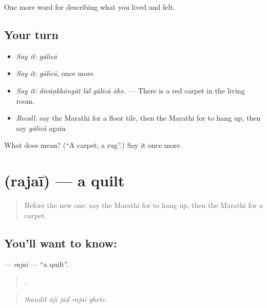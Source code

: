 \begin{grammarlens}[title={What you've built}]
One more word for describing what you lived and felt.
\end{grammarlens}

\subsection*{Your turn}
\begin{itemize}
\raggedright
  \item \emph{Say it:} \emph{gālicā}
  \item \emph{Say it:} \emph{gālicā}, once more
  \item \emph{Say it:} \emph{divāṇkhānyāt lāl gālicā āhe.} — There is a red carpet in the living room.
  \item \emph{Recall:} say the Marathi for a floor tile, then the Marathi for to hang up, then say \emph{gālicā} again
\end{itemize}

\begin{tcolorbox}[breakable,colback=teal!4,colframe=teal!35!black,title={Before you move on}]
What does  mean? (\textquotedblleft{}A carpet; a rug\textquotedblright{}.) Say it once more.
\end{tcolorbox}
\section[\texorpdfstring{\mr{रजई} (rajaī)}{रजई (rajaī)}]{ (rajaī) — a quilt}

\label{lesson:MR-C523-rajai}



\begin{quote}
Before the new one: say the Marathi for to hang up, then the Marathi for a carpet.
\end{quote}

\subsection*{You'll want to know: }
\textbf{} — \emph{rajaī} — \textquotedblleft{}a quilt\textquotedblright{}.

\begin{quote}
    .
\end{quote}

\begin{quote}
\emph{thaṇḍīt ājī jāḍ rajaī ghete.}
\end{quote}

